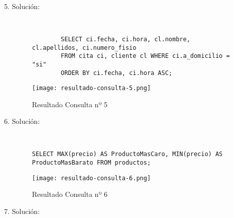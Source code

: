 \begin{enumerate}
    \setcounter{enumi}{4}
    \item Solución:

    \begin{figure}[H]
        \begin{tcolorbox}[sharp corners, colback=yellow!30, colframe=white!20]
            \scriptsize
            \begin{verbatim}


        SELECT ci.fecha, ci.hora, cl.nombre, cl.apellidos, ci.numero_fisio
        FROM cita ci, cliente cl WHERE ci.a_domicilio = "si"
        ORDER BY ci.fecha, ci.hora ASC;
            \end{verbatim}
        \end{tcolorbox}
    \end{figure}

    \begin{figure}[H]
        \centering
        \texttt{[image: resultado-consulta-5.png]}
        \caption{Resultado Consulta nº 5}
    \end{figure}

    \item Solución:

      \begin{figure}[H]
        \begin{tcolorbox}[sharp corners, colback=yellow!30, colframe=white!20]
            \scriptsize
            \begin{verbatim}


SELECT MAX(precio) AS ProductoMasCaro, MIN(precio) AS ProductoMasBarato FROM productos;
            \end{verbatim}
        \end{tcolorbox}
    \end{figure}

    \begin{figure}[H]
        \centering
        \texttt{[image: resultado-consulta-6.png]}
        \caption{Resultado Consulta nº 6}
    \end{figure}

    \item Solución:

    \begin{figure}[H]
        \begin{tcolorbox}[sharp corners, colback=yellow!30, colframe=white!20]
            \scriptsize
            \begin{verbatim}



\end{verbatim}
\end{tcolorbox}
\end{figure}
\end{enumerate}
